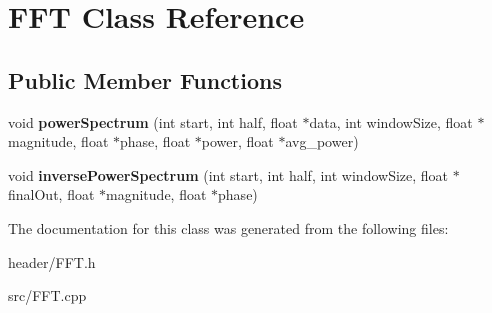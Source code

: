 \hypertarget{classFFT}{}\section{F\+FT Class Reference}
\label{classFFT}
\subsection*{Public Member Functions}
\begin{DoxyCompactItemize}
\item 
void {\bfseries power\+Spectrum} (int start, int half, float $\ast$data, int window\+Size, float $\ast$magnitude, float $\ast$phase, float $\ast$power, float $\ast$avg\+\_\+power)\hypertarget{classFFT_ad038ab187e20c4f628545f51b8822a1b}{}\label{classFFT_ad038ab187e20c4f628545f51b8822a1b}

\item 
void {\bfseries inverse\+Power\+Spectrum} (int start, int half, int window\+Size, float $\ast$final\+Out, float $\ast$magnitude, float $\ast$phase)\hypertarget{classFFT_a2f17d2309d72e26032d8909fa7bfd016}{}\label{classFFT_a2f17d2309d72e26032d8909fa7bfd016}

\end{DoxyCompactItemize}


The documentation for this class was generated from the following files\+:\begin{DoxyCompactItemize}
\item 
header/F\+F\+T.\+h\item 
src/F\+F\+T.\+cpp\end{DoxyCompactItemize}
